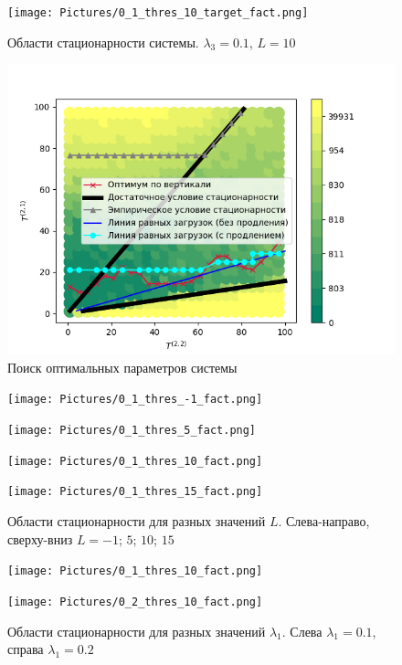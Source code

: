 \begin{figure}[h]
\centering
\texttt{[image: Pictures/0\_1\_thres\_10\_target\_fact.png]} 
\caption{Области стационарности системы. $\lambda_3=0.1$, $L=10$}
\label{Experiment:stationar}
\end{figure}
\begin{figure}[h]
\centering
\includegraphics[scale=0.9]{Pictures/0_1_thres_10_target_new.png} 
\caption{Поиск оптимальных параметров системы}
\label{Experiment:targets}
\end{figure}




\begin{figure}
\begin{multicols}{2}
    \texttt{[image: Pictures/0\_1\_thres\_-1\_fact.png]}\par 
    \texttt{[image: Pictures/0\_1\_thres\_5\_fact.png]}\par 
    \end{multicols}
\begin{multicols}{2}
    \texttt{[image: Pictures/0\_1\_thres\_10\_fact.png]}\par
    \texttt{[image: Pictures/0\_1\_thres\_15\_fact.png]}\par
\end{multicols}
\caption{Области стационарности для разных значений $L$. Слева-направо, сверху-вниз $L=-1$; $5$; $10$; $15$}
\label{different:thres}
\end{figure}

\vspace{-10cm}
\begin{figure}[H]
\begin{multicols}{2}
    \texttt{[image: Pictures/0\_1\_thres\_10\_fact.png]}\par 
    \texttt{[image: Pictures/0\_2\_thres\_10\_fact.png]}\par 
    \end{multicols}
\caption{Области стационарности для разных значений $\lambda_1$. Слева $\lambda_1=0.1$, справа $\lambda_1=0.2$}
\label{Experiment:intensities}
\end{figure}
